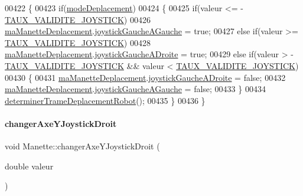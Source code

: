 \begin{DoxyCode}
00422 \{
00423     \textcolor{keywordflow}{if}(\hyperlink{class_manette_a4dc6231c8cc65fac03f59d323fa9a038}{modeDeplacement})
00424     \{
00425         \textcolor{keywordflow}{if}(valeur <= -\hyperlink{manette_8h_a1ae244fc787303cd46a9b684fb4b4056}{TAUX\_VALIDITE\_JOYSTICK})
00426             \hyperlink{class_manette_af3d0f304c4c33e02bdf34fc99aa4dbff}{maManetteDeplacement}.\hyperlink{struct_etat_manette_deplacement_af7e92a8d8f116e2bc4a5a95386f604e7}{joystickGaucheAGauche} = \textcolor{keyword}{true};
00427         \textcolor{keywordflow}{else} \textcolor{keywordflow}{if}(valeur >= \hyperlink{manette_8h_a1ae244fc787303cd46a9b684fb4b4056}{TAUX\_VALIDITE\_JOYSTICK})
00428             \hyperlink{class_manette_af3d0f304c4c33e02bdf34fc99aa4dbff}{maManetteDeplacement}.\hyperlink{struct_etat_manette_deplacement_a8fa93da5af430ac00ffd4ee8b76987a2}{joystickGaucheADroite} = \textcolor{keyword}{true};
00429         \textcolor{keywordflow}{else} \textcolor{keywordflow}{if}(valeur > -\hyperlink{manette_8h_a1ae244fc787303cd46a9b684fb4b4056}{TAUX\_VALIDITE\_JOYSTICK} && valeur < 
      \hyperlink{manette_8h_a1ae244fc787303cd46a9b684fb4b4056}{TAUX\_VALIDITE\_JOYSTICK})
00430         \{
00431             \hyperlink{class_manette_af3d0f304c4c33e02bdf34fc99aa4dbff}{maManetteDeplacement}.\hyperlink{struct_etat_manette_deplacement_a8fa93da5af430ac00ffd4ee8b76987a2}{joystickGaucheADroite} = \textcolor{keyword}{false};
00432             \hyperlink{class_manette_af3d0f304c4c33e02bdf34fc99aa4dbff}{maManetteDeplacement}.\hyperlink{struct_etat_manette_deplacement_af7e92a8d8f116e2bc4a5a95386f604e7}{joystickGaucheAGauche} = \textcolor{keyword}{false};
00433         \}
00434         \hyperlink{class_manette_a97a50caac68954a229c7e9461e7f4232}{determinerTrameDeplacementRobot}();
00435     \}
00436 \}
\end{DoxyCode}
\mbox{\label{class_manette_aaedc46e870b2731a79c5497296dba469}} 
\paragraph{\texorpdfstring{changer\+Axe\+Y\+Joystick\+Droit}{changerAxeYJoystickDroit}}
{\footnotesize\ttfamily void Manette\+::changer\+Axe\+Y\+Joystick\+Droit (\begin{DoxyParamCaption}\item[{double}]{valeur }\end{DoxyParamCaption})\hspace{0.3cm}{\ttfamily [slot]}}



